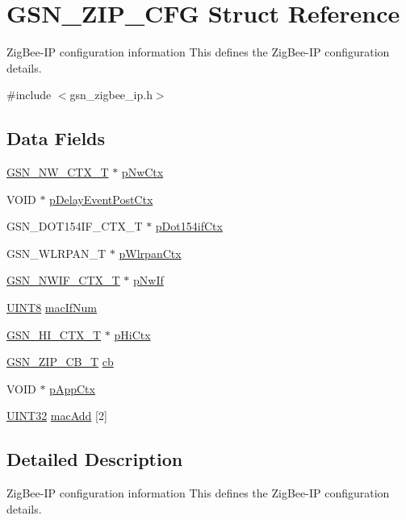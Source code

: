 \hypertarget{a00438}{
\section{GSN\_\-ZIP\_\-CFG Struct Reference}
\label{a00438}
}


ZigBee-\/IP configuration information This defines the ZigBee-\/IP configuration details.  




{\ttfamily \#include $<$gsn\_\-zigbee\_\-ip.h$>$}

\subsection*{Data Fields}
\begin{DoxyCompactItemize}
\item 
\hyperlink{a00164}{GSN\_\-NW\_\-CTX\_\-T} $\ast$ \hyperlink{a00438_a4ab8e1b7273bd13fb04f9726ebf1d430}{pNwCtx}
\item 
VOID $\ast$ \hyperlink{a00438_afcc216c129528dccc51653661a14eaef}{pDelayEventPostCtx}
\item 
GSN\_\-DOT154IF\_\-CTX\_\-T $\ast$ \hyperlink{a00438_a91d8d05dbfee6a1576323053fad49148}{pDot154ifCtx}
\item 
GSN\_\-WLRPAN\_\-T $\ast$ \hyperlink{a00438_accc25c6898f60fabd65c1c5dca39b804}{pWlrpanCtx}
\item 
\hyperlink{a00167}{GSN\_\-NWIF\_\-CTX\_\-T} $\ast$ \hyperlink{a00438_a162db5da6960431ec48a784907bd6fb9}{pNwIf}
\item 
\hyperlink{a00660_gab27e9918b538ce9d8ca692479b375b6a}{UINT8} \hyperlink{a00438_ae57ae92e651751e7978e237c55133b4c}{macIfNum}
\item 
\hyperlink{a00085}{GSN\_\-HI\_\-CTX\_\-T} $\ast$ \hyperlink{a00438_ab671e23204d79f8fda7dba9992c3d6e9}{pHiCtx}
\item 
\hyperlink{a00618_a537c0cfba52f252417cd654bd4cece58}{GSN\_\-ZIP\_\-CB\_\-T} \hyperlink{a00438_abe44915a1959b03524b5b861b2374024}{cb}
\item 
VOID $\ast$ \hyperlink{a00438_a05a138152af2aedc27575fbb40a5236a}{pAppCtx}
\item 
\hyperlink{a00660_gae1e6edbbc26d6fbc71a90190d0266018}{UINT32} \hyperlink{a00438_a25cba5997ae9dca53bc0838fe7da1ef5}{macAdd} \mbox{[}2\mbox{]}
\end{DoxyCompactItemize}


\subsection{Detailed Description}
ZigBee-\/IP configuration information This defines the ZigBee-\/IP configuration details. 

